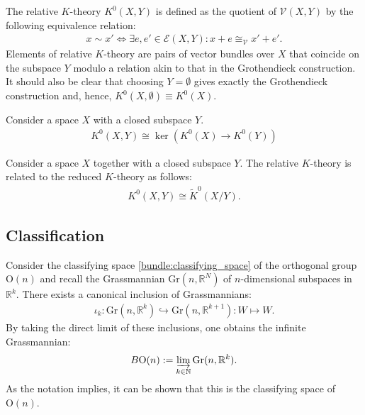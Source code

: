 {{        The relative $K$-theory $K^0(X,Y)$ is defined as the quotient of $\mathscr{V}(X,Y)$ by the following equivalence relation:
        \begin{gather}
            x\sim x' \iff \exists e,e'\in\mathscr{E}(X,Y):x+e\cong_\mathscr{V}x'+e'.
        \end{gather}
        Elements of relative $K$-theory are pairs of vector bundles over $X$ that coincide on the subspace $Y$ modulo a relation akin to that in the Grothendieck construction. It should also be clear that choosing $Y=\emptyset$ gives exactly the Grothendieck construction and, hence, $K^0(X,\emptyset)\equiv K^0(X)$.
    }
    \begin{property}
        Consider a space $X$ with a closed subspace $Y$.
        \begin{gather}
            K^0(X,Y)\cong\ker\left(K^0(X)\rightarrow K^0(Y)\right)
        \end{gather}
    \end{property}
    \begin{property}[Excision]\label{k:excision}
        Consider a space $X$ together with a closed subspace $Y$. The relative $K$-theory is related to the reduced $K$-theory as follows:
        \begin{gather}
            K^0(X,Y)\cong\widetilde{K}^0(X/Y).
        \end{gather}
    \end{property}

\subsection{Classification}

    \begin{property}
        Consider the classifying space \ref{bundle:classifying_space} of the orthogonal group $\mathrm{O}(n)$ and recall the Grassmannian $\mathrm{Gr}(n,\mathbb{R}^N)$ of $n$-dimensional subspaces in $\mathbb{R}^k$. There exists a canonical inclusion of Grassmannians:
        \begin{gather}
            \iota_k:\mathrm{Gr}(n,\mathbb{R}^k)\hookrightarrow\mathrm{Gr}(n,\mathbb{R}^{k+1}):W\mapsto W.
        \end{gather}
        By taking the direct limit of these inclusions, one obtains the infinite Grassmannian:
        \begin{gather}
            B\mathrm{O}(n) := \varinjlim_{k\in\mathbb{N}}\mathrm{Gr}(n,\mathbb{R}^k).
        \end{gather}
        As the notation implies, it can be shown that this is the classifying space of $\mathrm{O}(n)$.


\end{property}}
